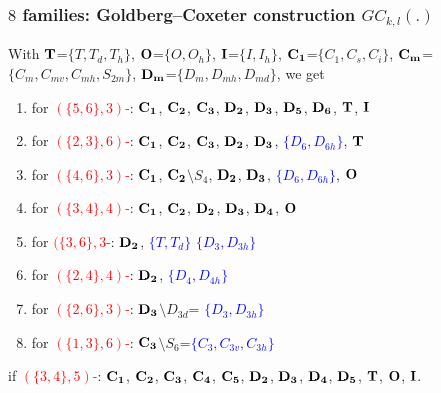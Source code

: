 \documentclass{beamer}
\begin{document}
\begin{frame}\frametitle{$8$ families: 
Goldberg--Coxeter construction  $GC_{k,l}(.)$}
\vspace{-2mm}
With
\textcolor{red}{${\bf T}$}=$\{T,T_d,T_h\}$, \textcolor{red}{${\bf O}$}=$\{O,O_h\}$,
\textcolor{red}{${\bf I}$}=$\{I,I_h\}$,
\textcolor{red}{${\bf C_1}$}=$\{C_1,C_s,C_i\}$,  
\textcolor{red}{${\bf C_m}$}=$\{C_m,C_{mv},C_{mh},S_{2m}\}$, 
 \textcolor{red}{${\bf D_m}$}=$\{D_m,D_{mh},D_{md}\}$,  
we get
\begin{enumerate}
\item
for \textcolor{red}{$(\{5,6\},3)$-}:
${\bf C_1}$,  ${\bf C_2}$, ${\bf C_3}$,  ${\bf D_2}$,  ${\bf D_3}$, ${\bf 
D_5}$,  ${\bf D_6}$, ${\bf T}$,  \textcolor{blue}{${\bf I}$}
\item
for \textcolor{red}{$(\{2, 3\},6)$-}: ${\bf C_1}$,
${\bf C_2}$, ${\bf C_3}$, ${\bf D_2}$, ${\bf D_3}$,
\textcolor{blue}{$\{D_6,D_{6h}\}$}, \textcolor{blue}{${\bf T}$}
\item
for \textcolor{red}{$(\{4,6\},3)$-}: ${\bf C_1}$, 
${\bf C_2}$$\setminus$$ S_{4}$, ${\bf D_2}$, ${\bf 
D_3}$,  \textcolor{blue}{$\{D_6,D_{6h}\}$}, \textcolor{blue}{${\bf O}$}
\item
for \textcolor{red}{$(\{3, 4\},4)$-}: ${\bf C_{1}}$,
${\bf C_2}$,  ${\bf D_2}$,
${\bf D_3}$, ${\bf D_4}$, \textcolor{blue}{${\bf O}$}
\item
for \textcolor{red}{$(\{3,6\},3$-}: ${\bf D_{2}}$, 
\textcolor{blue}{$\{T,T_d\}$} 
\textcolor{blue}{$\{D_3,D_{3h}\}$}
\item
for \textcolor{red}{$(\{2, 4\},4)$-}: ${\bf D_2}$,  
\textcolor{blue}{$\{D_4,D_{4h}\}$}
\item
for \textcolor{red}{$(\{2, 6\},3)$-}: 
${\bf D_3}$$\setminus$$ D_{3d}$=
\textcolor{blue}{$\{D_3,D_{3h}\}$}
\item
for \textcolor{red}{$(\{1, 3\},6)$-}:
${\bf C_3}$$\setminus$$ S_{6}$=\textcolor{blue}{$\{C_3,
C_{3v},C_{3h}\}$}
\end{enumerate}
if  \textcolor{red}{$(\{3,4\},5)$-}:
${\bf C_1}$,  ${\bf C_2}$, ${\bf C_3}$,  ${\bf C_4}$, ${\bf C_5}$, ${\bf D_2}$,  
${\bf D_3}$, ${\bf
D_4}$,  ${\bf D_5}$, ${\bf T}$,  ${\bf O}$, ${\bf I}$.



\end{frame}
\end{document}
